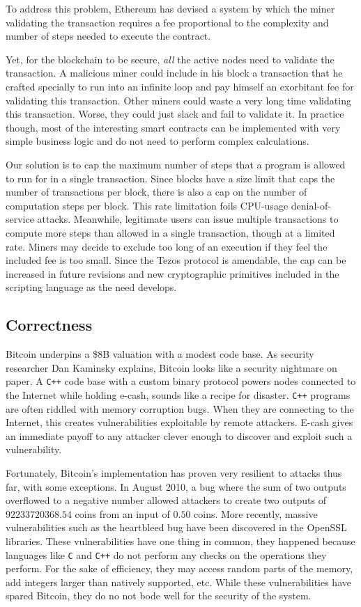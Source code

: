 \documentclass[letterpaper]{article}
\begin{document}
To address this problem, Ethereum has devised a system by which the miner
validating the transaction requires a fee proportional to the complexity
and number of steps needed to execute the contract.

Yet, for  the blockchain to be secure, \emph{all} the active nodes need to
validate the transaction. A malicious miner could include in his block a
transaction that he crafted specially to run into an infinite loop and pay
himself an exorbitant fee for validating this transaction. Other miners could
waste a very long time validating this transaction. Worse, they could just
slack and fail to validate it. In practice though, most of the interesting
smart contracts can be implemented with very simple business logic and do not
need to perform complex calculations.

Our solution is to cap the maximum number of steps that a program is allowed to
run for in a single transaction. Since blocks have a size limit that caps the
number of transactions per block, there is also a cap on the number of
computation steps per block. This rate limitation foils CPU-usage
denial-of-service attacks. Meanwhile, legitimate users can issue multiple
transactions to compute more steps than allowed in a single transaction,
though at a limited rate. Miners may decide to exclude too long of an execution
if they feel the included fee is too small. Since the Tezos protocol is
amendable, the cap can be increased in future revisions and new cryptographic
primitives included in the scripting language as the need develops.

\subsection{Correctness}
Bitcoin underpins a \$8B valuation with a modest code base. As security
researcher Dan Kaminsky explains, Bitcoin looks like a security nightmare on
paper. A \verb!C++! code base with a custom binary protocol powers nodes
connected to the Internet while holding e-cash, sounds like a recipe for
disaster. \verb!C++! programs are often riddled with memory corruption bugs.
When they are connecting to the Internet, this creates vulnerabilities
exploitable by remote attackers. E-cash gives an immediate payoff to any
attacker clever enough to discover and exploit such a vulnerability.

Fortunately, Bitcoin's implementation has proven very resilient to attacks
thus far, with some exceptions. In August 2010, a bug where the sum of two
outputs overflowed to a negative number allowed attackers to create two
outputs of $92233720368.54$ coins from an input of $0.50$ coins.
More recently, massive vulnerabilities such as the heartbleed bug
have been discovered in the OpenSSL libraries. These vulnerabilities have
one thing in common, they happened because languages like \verb!C! and
\verb!C++! do not perform any checks on the operations they perform. For the
sake of efficiency, they may access random parts of the memory, add integers
larger than natively supported, etc. While these vulnerabilities have spared
Bitcoin, they do no not bode well for the security of the system.
\end{document}
